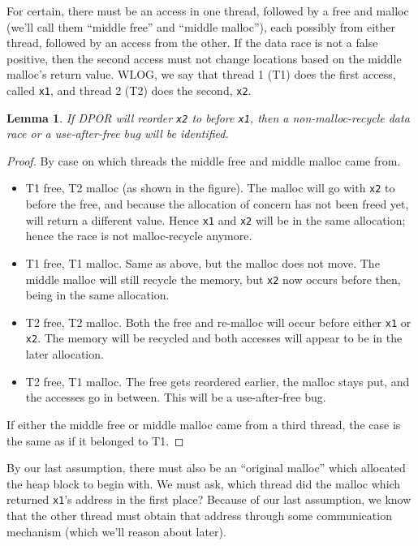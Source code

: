 \documentclass[pldi]{sigplanconf-pldi15}
\newtheorem{lemma}{Lemma}
\begin{document}
For certain, there must be an access in one thread, followed by a free and malloc (we'll call them ``middle free'' and ``middle malloc''), each possibly from either thread, followed by an access from the other.
If the data race is not a false positive, then the second access must not change locations based on the middle malloc's return value.
WLOG, we say that thread 1 (T1) does the first access, called {\tt x1}, and thread 2 (T2) does the second, {\tt x2}.

\begin{lemma}
	If DPOR will reorder {\tt x2} to before {\tt x1}, then a non-malloc-recycle data race or a use-after-free bug will be identified.
	\label{lem:reorder}
\end{lemma}
\begin{proof}
By case on which threads the middle free and middle malloc came from.
\begin{itemize}
	\item T1 free, T2 malloc (as shown in the figure). The malloc will go with {\tt x2} to before the free, and because the allocation of concern has not been freed yet, will return a different value. Hence {\tt x1} and {\tt x2} will be in the same allocation; hence the race is not malloc-recycle anymore.
	\item T1 free, T1 malloc. Same as above, but the malloc does not move. The middle malloc will still recycle the memory, but {\tt x2} now occurs before then, being in the same allocation.
	\item T2 free, T2 malloc. Both the free and re-malloc will occur before either {\tt x1} or {\tt x2}. The memory will be recycled and both accesses will appear to be in the later allocation.
	\item T2 free, T1 malloc. The free gets reordered earlier, the malloc stays put, and the accesses go in between. This will be a use-after-free bug.
\end{itemize}
If either the middle free or middle malloc came from a third thread, the case is the same as if it belonged to T1.
\end{proof}

By our last assumption, there must also be an ``original malloc'' which allocated the heap block to begin with.
We must ask, which thread did the malloc which returned {\tt x1}'s address in the first place?
Because of our last assumption, we know that the other thread must obtain that address through some communication mechanism (which we'll reason about later).
\end{document}
